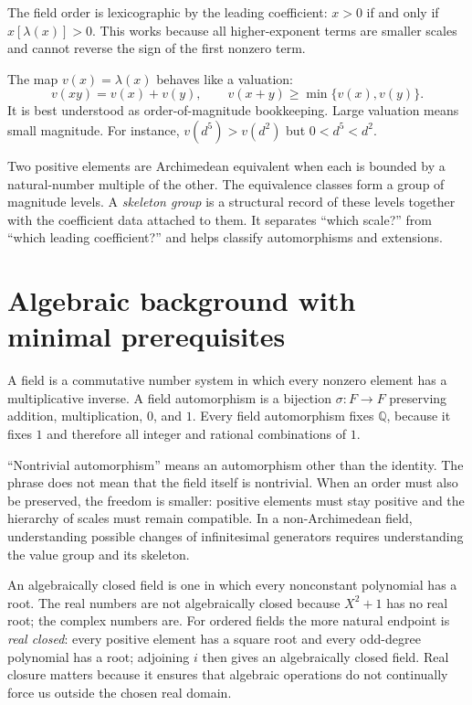 \documentclass[11pt,a4paper]{article}
\theoremstyle{remark}
\newcommand{\Q}{\mathbb Q}
\begin{document}
The field order is lexicographic by the leading coefficient: $x>0$ if and only if
$x[\lambda(x)]>0$. This works because all higher-exponent terms are smaller scales and cannot
reverse the sign of the first nonzero term.

The map $v(x)=\lambda(x)$ behaves like a valuation:
\[
v(xy)=v(x)+v(y),\qquad
v(x+y)\ge\min\{v(x),v(y)\}.
\]
It is best understood as order-of-magnitude bookkeeping. Large valuation means small magnitude.
For instance, $v(d^5)>v(d^2)$ but $0<d^5<d^2$.

Two positive elements are Archimedean equivalent when each is bounded by a natural-number
multiple of the other. The equivalence classes form a group of magnitude levels. A
\emph{skeleton group} is a structural record of these levels together with the coefficient data
attached to them. It separates ``which scale?'' from ``which leading coefficient?'' and helps
classify automorphisms and extensions.

\section{Algebraic background with minimal prerequisites}

A field is a commutative number system in which every nonzero element has a multiplicative
inverse. A field automorphism is a bijection $\sigma:F\to F$ preserving addition, multiplication,
$0$, and $1$. Every field automorphism fixes $\Q$, because it fixes $1$ and therefore all integer
and rational combinations of $1$.

``Nontrivial automorphism'' means an automorphism other than the identity. The phrase does not
mean that the field itself is nontrivial. When an order must also be preserved, the freedom is
smaller: positive elements must stay positive and the hierarchy of scales must remain compatible.
In a non-Archimedean field, understanding possible changes of infinitesimal generators requires
understanding the value group and its skeleton.

An algebraically closed field is one in which every nonconstant polynomial has a root. The real
numbers are not algebraically closed because $X^2+1$ has no real root; the complex numbers are.
For ordered fields the more natural endpoint is \emph{real closed}: every positive element has a
square root and every odd-degree polynomial has a root; adjoining $i$ then gives an algebraically
closed field. Real closure matters because it ensures that algebraic operations do not continually
force us outside the chosen real domain.
\end{document}

